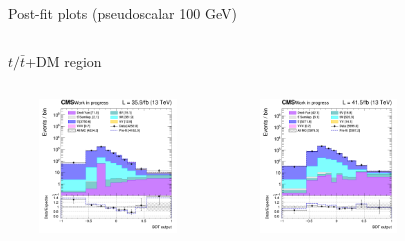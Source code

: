 \documentclass[8pt]{beamer}
\begin{document}
\begin{frame}{Post-fit plots (pseudoscalar 100 GeV)}
\begin{columns}
\begin{column}{1.09\textwidth}
\begin{block}{\centering $t/\bar t$+DM region}\end{block} \vspace{10pt}
\end{column}
\end{columns} \vspace{-24pt}
\begin{columns}
		\begin{column}{0.33\textwidth}
			\begin{center}
			\begin{block}{}\end{block}	
     			\includegraphics[width=1.0\textwidth, height=100pt]{figs/postfits/2016/log_cratio_ST_topCR_ll_BDT_tDM100_TTbar_BDT_output_pseudoscalar100_customBinsAttempt7.png}
    		\end{center}		
		\end{column} 
		\begin{column}{0.33\textwidth}
			\begin{center}
			\begin{block}{}\end{block}	
     			\includegraphics[width=1.0\textwidth, height=100pt]{figs/postfits/2017/log_cratio_ST_topCR_ll_BDT_tDM100_TTbar_BDT_output_pseudoscalar100_customBinsAttempt7.png}
    		\end{center}		
		\end{column} 
		\begin{column}{0.33\textwidth}
			\begin{center}

\end{center}
\end{column}
\end{columns}
\end{frame}
\end{document}
